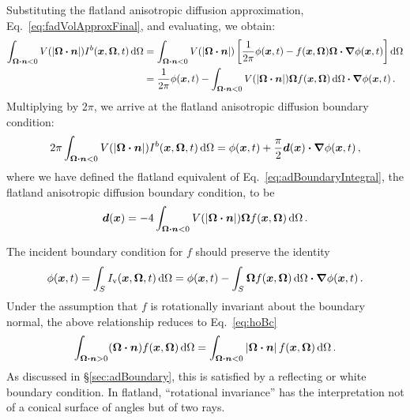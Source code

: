 Substituting the flatland anisotropic diffusion approximation,
Eq.~\eqref{eq:fadVolApproxFinal}, and evaluating, we obtain:
\begin{align*}
\int_{\bm{\Omega}\bm{\cdot}\bm{n} < 0} V( \left| \bm{\Omega}\bm{\cdot}\bm{n} \right|)
I^b(\bm{x}, \bm{\Omega},t) \mathop{}\!\mathrm{d}\Omega
&=
\int_{\bm{\Omega}\bm{\cdot}\bm{n} < 0} V( \left| \bm{\Omega}\bm{\cdot}\bm{n} \right|)
\left[ \frac{1}{2\pi} \phi(\bm{x},t)
  - f(\bm{x}, \bm{\Omega}) \bm{\Omega}\bm{\cdot} \bm{\nabla} \phi(\bm{x},t)
 \right] \mathop{}\!\mathrm{d}\Omega
\\
&= 
 \frac{1}{2\pi} \phi(\bm{x},t)
 - \int_{\bm{\Omega}\bm{\cdot}\bm{n} < 0} V( \left| \bm{\Omega}\bm{\cdot}\bm{n} \right|) 
 \bm{\Omega} f(\bm{x}, \bm{\Omega})  \mathop{}\!\mathrm{d}\Omega 
 \bm{\cdot} \bm{\nabla} \phi(\bm{x},t) \,.
\end{align*}
Multiplying by $2\pi$, we arrive at the flatland anisotropic diffusion boundary
condition:
\begin{equation}\label{eq:flatAdBc}
2\pi \int_{\bm{\Omega}\bm{\cdot}\bm{n} < 0} V( \left| \bm{\Omega}\bm{\cdot}\bm{n} \right|)
I^b(\bm{x}, \bm{\Omega},t) \mathop{}\!\mathrm{d}\Omega
=
\phi(\bm{x},t)
+ \frac{\pi}{2} \bm{d}(\bm{x}) \bm{\cdot} \bm{\nabla} \phi(\bm{x},t)\,,
\end{equation}
where we have defined the flatland equivalent of
Eq.~\eqref{eq:adBoundaryIntegral}, the flatland anisotropic diffusion boundary
condition, to be
\begin{equation}\label{eq:flatAdBoundaryIntegral}
  \bm{d}(\bm{x}) = -4\int_{\bm{\Omega}\bm{\cdot}\bm{n} < 0}
  V(\left| \bm{\Omega}\bm{\cdot}\bm{n} \right|)
\bm{\Omega} f(\bm{x}, \bm{\Omega}) \mathop{}\!\mathrm{d}\Omega\,.
\end{equation}

The incident boundary condition for $f$ should preserve the identity
\begin{equation*}
  \phi(\bm{x},t) = \int_{S} I_\mathrm{v}(\bm{x},\bm{\Omega},t) \mathop{}\!\mathrm{d}\Omega
  = \phi(\bm{x},t) - \int_{S} \bm{\Omega} f(\bm{x},\bm{\Omega}) \mathop{}\!\mathrm{d}\Omega
  \bm{\cdot} \bm{\nabla} \phi(\bm{x},t) \,.
\end{equation*}
Under the assumption that $f$ is rotationally invariant about the
boundary normal, the above relationship reduces to Eq.~\eqref{eq:hoBc}
\begin{equation*}
  \int_{\bm{\Omega}\bm{\cdot}\bm{n} > 0} (\bm{\Omega}\bm{\cdot} \bm{n})
  f(\bm{x}, \bm{\Omega}) \mathop{}\!\mathrm{d}\Omega
  =
  \int_{\bm{\Omega}\bm{\cdot}\bm{n} < 0} \left| \bm{\Omega}\bm{\cdot} \bm{n} \right|
  f(\bm{x}, \bm{\Omega}) \mathop{}\!\mathrm{d}\Omega \,.
\end{equation*}
As discussed in \S\ref{sec:adBoundary}, this is satisfied by a reflecting or
white boundary condition. In flatland, ``rotational invariance'' has the
interpretation not of a conical surface of angles but of two rays.

